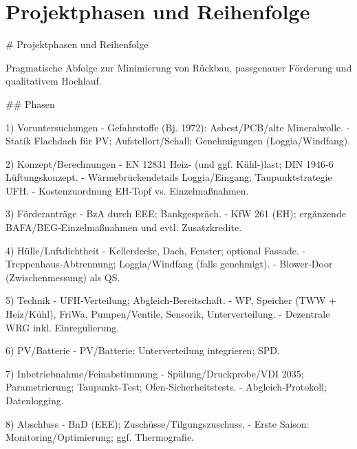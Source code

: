 \documentclass[11pt,oneside]{report}
\begin{document}
\chapter{Projektphasen und Reihenfolge}
\begin{markdown}
# Projektphasen und Reihenfolge

Pragmatische Abfolge zur Minimierung von Rückbau, passgenauer Förderung und qualitativem Hochlauf.

## Phasen

1) Voruntersuchungen
- Gefahrstoffe (Bj. 1972): Asbest/PCB/alte Mineralwolle.
- Statik Flachdach für PV; Aufstellort/Schall; Genehmigungen (Loggia/Windfang).

2) Konzept/Berechnungen
- EN 12831 Heiz‑ (und ggf. Kühl‑)last; DIN 1946‑6 Lüftungskonzept.
- Wärmebrückendetails Loggia/Eingang; Taupunktstrategie UFH.
- Kostenzuordnung EH‑Topf vs. Einzelmaßnahmen.

3) Förderanträge
- BzA durch EEE; Bankgespräch.
- KfW 261 (EH); ergänzende BAFA/BEG‑Einzelmaßnahmen und evtl. Zusatzkredite.

4) Hülle/Luftdichtheit
- Kellerdecke, Dach, Fenster; optional Fassade.
- Treppenhaus‑Abtrennung; Loggia/Windfang (falls genehmigt).
- Blower‑Door (Zwischenmessung) als QS.

5) Technik
- UFH‑Verteilung; Abgleich‑Bereitschaft.
- WP, Speicher (TWW + Heiz/Kühl), FriWa, Pumpen/Ventile, Sensorik, Unterverteilung.
- Dezentrale WRG inkl. Einregulierung.

6) PV/Batterie
- PV/Batterie; Unterverteilung integrieren; SPD.

7) Inbetriebnahme/Feinabstimmung
- Spülung/Druckprobe/VDI 2035; Parametrierung; Taupunkt‑Test; Ofen‑Sicherheitstests.
- Abgleich‑Protokoll; Datenlogging.

8) Abschluss
- BnD (EEE); Zuschüsse/Tilgungszuschuss.
- Erste Saison: Monitoring/Optimierung; ggf. Thermografie.
\end{markdown}
\end{document}
